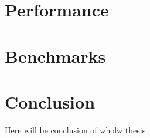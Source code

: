 \documentclass[oneside, 12pt]{book}
\begin{document}


\chapter{Performance}\label{chap:performance}


\chapter{Benchmarks}\label{chap:benchmarks}



\pagestyle{plain}
\chapter*{Conclusion}\label{chap:conclusion}

Here will be conclusion of wholw thesis






\backmatter
\end{document}
